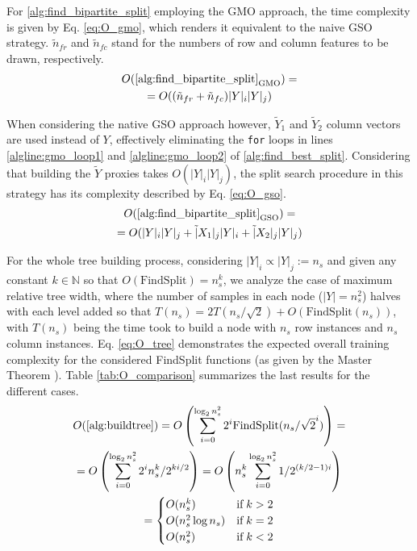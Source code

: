 For \ref{alg:find_bipartite_split} employing the GMO approach, the time complexity is given by Eq. \ref{eq:O_gmo}, which renders it equivalent to the naive GSO strategy. $\tilde n_{fr}$ and $\tilde n_{fc}$ stand for the numbers of row and column features to be drawn, respectively.
%
\begin{multline}
    O(\ref{alg:find_bipartite_split}_\text{GMO}) =\\
    =O((\tilde n_{fr} + \tilde n_{fc}) |Y|_i|Y|_j)
    \label{eq:O_gmo}
\end{multline}

When considering the native GSO approach however, $\tilde Y_1$ and $\tilde Y_2$ column vectors are used instead of $Y$, effectively eliminating the \texttt{for} loops in lines \ref{algline:gmo_loop1} and \ref{algline:gmo_loop2} of \ref{alg:find_best_split}. Considering that building the $\tilde Y$ proxies takes $O(|Y|_i|Y|_j)$, the split search procedure in this strategy has its complexity described by Eq. \ref{eq:O_gso}.
%
\begin{multline}
    O(\ref{alg:find_bipartite_split}_\text{GSO}) =\\
    = O(|Y|_i|Y|_j + \tilde |X_1|_j|Y|_i + \tilde |X_2|_j|Y|_j)
    \label{eq:O_gso}
\end{multline}

For the whole tree building process, considering $|Y|_i \propto |Y|_j := n_s$ and given any constant $k \in \mathbb{N}$ so that $O(\text{FindSplit})=n_s^k$, we analyze the case of maximum relative tree width, where the number of samples in each node ($|Y| = n_s^2$) halves with each level added so that $T(n_s) = 2T(n_s/\sqrt 2) + O(\text{FindSplit}(n_s))$, with $T(n_s)$ being the time took to build a node with $n_s$ row instances and $n_s$ column instances. Eq. \ref{eq:O_tree} demonstrates the expected overall training complexity for the considered FindSplit functions (as given by the Master Theorem \cite{}). Table \ref{tab:O_comparison} summarizes the last results for the different cases.
%
\begin{multline}
    O(\ref{alg:buildtree})
    = O\left(\sum_{i=0}^{\log_2n_s^2} 2^i \text{FindSplit}(n_s/\sqrt{2}^i)\right)
    =\\
    = O\left(\sum_{i=0}^{\log_2n_s^2} 2^i n_s^k/2^{ki/2}\right)
    = O\left(n_s^k \sum_{i=0}^{\log_2n_s^2} 1 /2^{(k/2-1)i}\right)
    \\
    =
    \begin{cases}
        O(n_s^k) & \text{if}\; k > 2\\
        O(n_s^2\log n_s) & \text{if}\; k = 2\\
        O(n_s^2) & \text{if}\; k < 2\\
    \end{cases}
    \label{eq:O_tree}
\end{multline}

